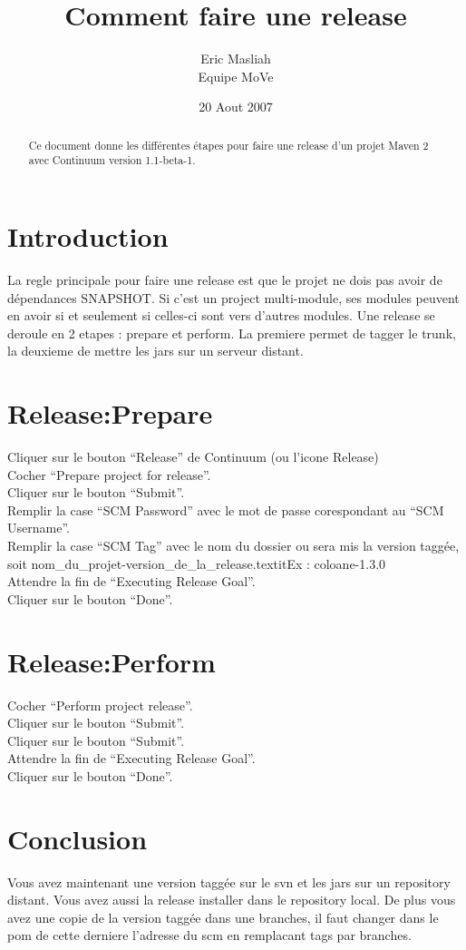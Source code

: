 \documentclass[a4paper,10pt]{article}
\title{Comment faire une release}
\author{Eric Masliah\\
Equipe MoVe}
\date{20 Aout 2007}
\begin{document}
\maketitle

\begin{abstract}
Ce document donne les différentes étapes pour faire une release d'un projet Maven 2  avec Continuum version 1.1-beta-1.
\end{abstract}

\section{Introduction}
La regle principale pour faire une release est que le projet ne dois pas avoir de dépendances SNAPSHOT. Si c'est un project multi-module, ses modules peuvent en avoir si et seulement si celles-ci sont vers d'autres modules. Une release se deroule en 2 etapes : prepare et perform. La premiere permet de tagger le trunk, la deuxieme de mettre les jars sur un serveur distant.

\section{Release:Prepare}
Cliquer sur le bouton ``Release'' de Continuum (ou l'icone Release)\\
Cocher ``Prepare project for release''.\\
Cliquer sur le bouton ``Submit''.\\
Remplir la case ``SCM Password'' avec le mot de passe corespondant au ``SCM Username''.\\
Remplir la case ``SCM Tag'' avec le nom du dossier ou sera mis la version taggée, soit nom\_du\_projet-version\_de\_la\_release.textit{Ex : coloane-1.3.0}\\
Attendre la fin de ``Executing Release Goal''.\\
Cliquer sur le bouton ``Done''.

\section{Release:Perform}
Cocher ``Perform project release''.\\
Cliquer sur le bouton ``Submit''.\\
Cliquer sur le bouton ``Submit''.\\
Attendre la fin de ``Executing Release Goal''.\\
Cliquer sur le bouton ``Done''.

\section{Conclusion}
Vous avez maintenant une version taggée sur le svn et les jars sur un repository distant. Vous avez aussi la release installer dans le repository local. De plus vous avez une copie de la version taggée dans une branches, il faut changer dans le pom de cette derniere l'adresse du scm en remplacant tags par branches.
\end{document}
